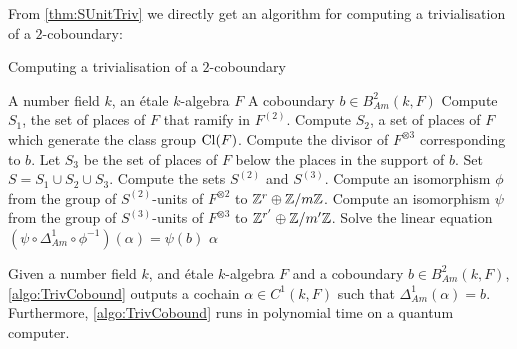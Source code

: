 From \cref{thm:SUnitTriv} we directly get an algorithm for computing a trivialisation of a \(2\)-coboundary:

\begin{algorithm}
    \caption{Computing a trivialisation of a \(2\)-coboundary}
    \label{algo:TrivCobound}
    \begin{algorithmic}[1]
        \REQUIRE A number field \(k\), an étale \(k\)-algebra \(F\)
        \REQUIRE A coboundary \(b \in B_{Am}^2(k,F)\)
        \STATE Compute \(S_1\), the set of places of \(F\) that ramify in \(F^{(2)}\).
        \STATE Compute \(S_2\), a set of places of \(F\) which generate the class group \(\operatorname{Cl}(F)\).
        \STATE Compute the divisor of \(F^{\otimes 3}\) corresponding to \(b\). Let \(S_3\) be the set of places of \(F\) below the places in the support of \(b\).
        \STATE Set \(S = S_1 \cup S_2 \cup S_3\).
        \STATE Compute the sets \(S^{(2)}\) and \(S^{(3)}\).
        \STATE Compute an isomorphism \(\phi\) from the group of \(S^{(2)}\)-units of \(F^{\otimes 2}\) to \(\mathbb{Z}^r \oplus \mathbb{Z}/m\mathbb{Z}\).
        \STATE Compute an isomorphism \(\psi\) from the group of \(S^{(3)}\)-units of \(F^{\otimes 3}\) to \(\mathbb{Z}^{r'} \oplus \mathbb{Z}/m'\mathbb{Z}\).
        \STATE Solve the linear equation \((\psi \circ \Delta_{Am}^1 \circ \phi^{-1})(\alpha) = \psi(b)\)
        \RETURN \(\alpha\)
    \end{algorithmic}
\end{algorithm}

\begin{theorem}\label{thm:AlgoTrivCobound}
    Given a number field \(k\), and étale \(k\)-algebra \(F\) and a coboundary \(b \in B^2_{Am}(k,F)\), \cref{algo:TrivCobound} outputs a cochain \(\alpha \in C^1(k,F)\) such that \(\Delta_{Am}^1(\alpha) = b\). Furthermore,  \cref{algo:TrivCobound} runs in polynomial time on a quantum computer.
\end{theorem}

